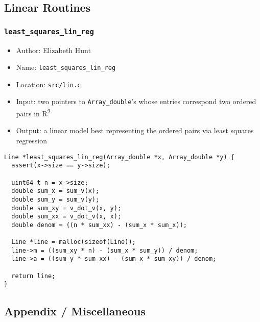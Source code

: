 \documentclass[11pt]{article}
\begin{document}
\subsection{Linear Routines}
\label{sec:org04f3e56}
\subsubsection{\texttt{least\_squares\_lin\_reg}}
\label{sec:orgbd48d8e}
\begin{itemize}
\item Author: Elizabeth Hunt
\item Name: \texttt{least\_squares\_lin\_reg}
\item Location: \texttt{src/lin.c}
\item Input: two pointers to \texttt{Array\_double}'s whose entries correspond two ordered
pairs in R\textsuperscript{2}
\item Output: a linear model best representing the ordered pairs via least squares
regression
\end{itemize}

\begin{verbatim}
Line *least_squares_lin_reg(Array_double *x, Array_double *y) {
  assert(x->size == y->size);

  uint64_t n = x->size;
  double sum_x = sum_v(x);
  double sum_y = sum_v(y);
  double sum_xy = v_dot_v(x, y);
  double sum_xx = v_dot_v(x, x);
  double denom = ((n * sum_xx) - (sum_x * sum_x));

  Line *line = malloc(sizeof(Line));
  line->m = ((sum_xy * n) - (sum_x * sum_y)) / denom;
  line->a = ((sum_y * sum_xx) - (sum_x * sum_xy)) / denom;

  return line;
}
\end{verbatim}
\subsection{Appendix / Miscellaneous}
\label{sec:orgf6b30a5}
\end{document}
